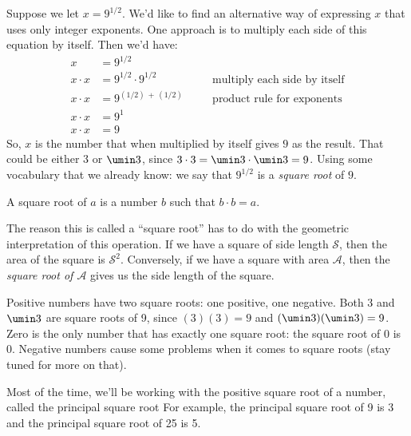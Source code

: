 Suppose we let $x = 9^{1/2}$. We'd like to find an alternative way of expressing $x$ that uses only integer exponents. One approach is to multiply each side of this equation by itself. Then we'd have:
\[\begin{aligned}
x 			&= 9^{1/2}\\
x\cdot x 	&= 9^{1/2} \cdot 9^{1/2}
&&\quad\text{multiply each side by itself}\\
x\cdot x	&= 9^{(1/2)\,+\,(1/2)}
&&\quad\text{product rule for exponents}\\
x\cdot x	&= 9^{1}\\
x\cdot x	&= 9
\end{aligned}\]
So, $x$ is the number that when multiplied by itself gives $9$ as the result. That could be either $3$ or $\umin3$, since $3\cdot 3 = \umin3 \cdot \umin3 = 9$. Using some vocabulary that we already know: we say that $9^{1/2}$ is a \textit{square root} of $9$.

\begin{boxeddef}
A \gls{square root} of $a$ is a number $b$ such that $b \cdot b = a$.
\end{boxeddef}

The reason this is called a ``square root'' has to do with the geometric interpretation of this operation. If we have a square of side length $\mathcal{S}$, then the area of the square is $\mathcal{S}^2$. Conversely, if we have a square with area $\mathcal{A}$, then the \textit{square root of $\mathcal{A}$} gives us the side length of the square. 

\begin{center}\end{center}

Positive numbers have two square roots: one positive, one negative. Both 3 and $\umin3$ are square roots of 9, since $(3)(3) = 9$ and $(\umin3)(\umin3) = 9$. Zero is the only number that has exactly one square root: the square root of 0 is 0. Negative numbers cause some problems when it comes to square roots (stay tuned for more on that).

Most of the time, we'll be working with the positive square root of a number, called the \gls{principal square root} For example, the principal square root of 9 is 3 and the principal square root of 25 is 5.


